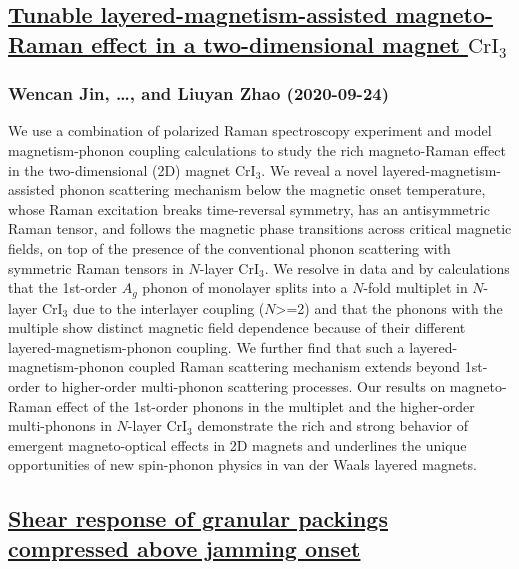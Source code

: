 \subsection*{\href{http://arxiv.org/abs/2009.11470v1}{Tunable layered-magnetism-assisted magneto-Raman effect in a  two-dimensional magnet $\mathrm{CrI_3}$}}
\subsubsection*{Wencan Jin, \dots, and Liuyan Zhao (2020-09-24)}
We use a combination of polarized Raman spectroscopy experiment and model
magnetism-phonon coupling calculations to study the rich magneto-Raman effect
in the two-dimensional (2D) magnet $\mathrm{CrI_3}$. We reveal a novel
layered-magnetism-assisted phonon scattering mechanism below the magnetic onset
temperature, whose Raman excitation breaks time-reversal symmetry, has an
antisymmetric Raman tensor, and follows the magnetic phase transitions across
critical magnetic fields, on top of the presence of the conventional phonon
scattering with symmetric Raman tensors in $N$-layer $\mathrm{CrI_3}$. We
resolve in data and by calculations that the 1st-order $A_g$ phonon of
monolayer splits into a $N$-fold multiplet in $N$-layer $\mathrm{CrI_3}$ due to
the interlayer coupling ($N$>=2) and that the phonons with the multiple show
distinct magnetic field dependence because of their different
layered-magnetism-phonon coupling. We further find that such a
layered-magnetism-phonon coupled Raman scattering mechanism extends beyond
1st-order to higher-order multi-phonon scattering processes. Our results on
magneto-Raman effect of the 1st-order phonons in the multiplet and the
higher-order multi-phonons in $N$-layer $\mathrm{CrI_3}$ demonstrate the rich
and strong behavior of emergent magneto-optical effects in 2D magnets and
underlines the unique opportunities of new spin-phonon physics in van der Waals
layered magnets.

\subsection*{\href{http://arxiv.org/abs/2009.11451v1}{Shear response of granular packings compressed above jamming onset}}

